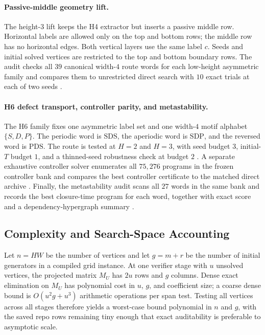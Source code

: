 \documentclass[11pt]{article}
\theoremstyle{definition}
\begin{document}
\paragraph{Passive-middle geometry lift.}
The height-$3$ lift keeps the H4 extractor but inserts a passive middle row. Horizontal labels are allowed only on the top and bottom rows; the middle row has no horizontal edges. Both vertical layers use the same label $c$. Seeds and initial solved vertices are restricted to the top and bottom boundary rows. The audit checks all $39$ canonical width-$4$ route words for each low-height asymmetric family and compares them to unrestricted direct search with $10$ exact trials at each of two seeds \citep{archivara_geometry_lift}.

\paragraph{H6 defect transport, controller parity, and metastability.}
The H6 family fixes one asymmetric label set and one width-$4$ motif alphabet $\{S,D,P\}$. The periodic word is $\mathrm{SDS}$, the aperiodic word is $\mathrm{SDP}$, and the reversed word is $\mathrm{PDS}$. The route is tested at $H=2$ and $H=3$, with seed budget $3$, initial-$T$ budget $1$, and a thinned-seed robustness check at budget $2$ \citep{archivara_h6_defect_transport}. A separate exhaustive controller solver enumerates all $75{,}276$ programs in the frozen controller bank and compares the best controller certificate to the matched direct archive \citep{archivara_boundary_controller}. Finally, the metastability audit scans all $27$ words in the same bank and records the best closure-time program for each word, together with exact score and a dependency-hypergraph summary \citep{archivara_metastability}.

\subsection{Complexity and Search-Space Accounting}

Let $n=HW$ be the number of vertices and let $g=m+r$ be the number of initial generators in a compiled grid instance. At one verifier stage with $u$ unsolved vertices, the projected matrix $M_U$ has $2u$ rows and $g$ columns. Dense exact elimination on $M_U$ has polynomial cost in $u$, $g$, and coefficient size; a coarse dense bound is $O(u^2g+u^3)$ arithmetic operations per span test. Testing all vertices across all stages therefore yields a worst-case bound polynomial in $n$ and $g$, with the saved repo rows remaining tiny enough that exact auditability is preferable to asymptotic scale.
\end{document}
